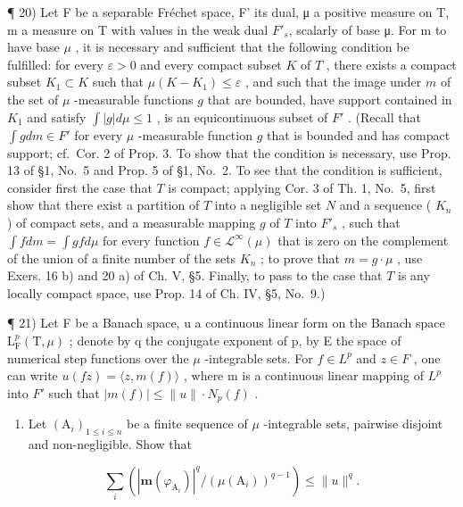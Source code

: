 ¶ 20) Let F be a separable Fréchet space, F' its dual, μ a positive measure on T, m a measure on T with values in the weak dual \(F'_s\), scalarly of base μ. For m to have base \(\mu\) , it is necessary and sufficient that the following condition be fulfilled: for every \(\varepsilon > 0\) and every compact subset \(K\) of \(T\) , there exists a compact subset \(K_1 \subset K\) such that \(\mu(K - K_1) \leqslant \varepsilon\) , and such that the image under \(m\) of the set of \(\mu\) -measurable functions \(g\) that are bounded, have support contained in \(K_1\) and satisfy \(\int |g| d\mu \leqslant 1\) , is an equicontinuous subset of \(F'\) . (Recall that \(\int g dm \in F'\) for every \(\mu\) -measurable function \(g\) that is bounded and has compact support; cf.~Cor. 2 of Prop. 3. To show that the condition is necessary, use Prop. 13 of §1, No.~5 and Prop. 5 of §1, No.~2. To see that the condition is sufficient, consider first the case that \(T\) is compact; applying Cor. 3 of Th. 1, No.~5, first show that there exist a partition of \(T\) into a negligible set \(N\) and a sequence ( \(K_n\) ) of compact sets, and a measurable mapping \(g\) of \(T\) into \(F'_s\) , such that \(\int f dm = \int g f d\mu\) for every function \(f \in \mathcal{L}^\infty(\mu)\) that is zero on the complement of the union of a finite number of the sets \(K_n\) ; to prove that \(m = g \cdot \mu\) , use Exers. 16 b) and 20 a) of Ch. V, §5. Finally, to pass to the case that \(T\) is any locally compact space, use Prop. 14 of Ch. IV, §5, No.~9.)

¶ 21) Let F be a Banach space, u a continuous linear form on the Banach space \(\mathrm{L}_{\mathrm{F}}^{p}(\mathrm{T},\mu)\) ; denote by q the conjugate exponent of p, by E the space of numerical step functions over the \(\mu\) -integrable sets. For \(f \in L^{p}\) and \(z \in F\) , one can write \(u(fz) = \langle z, m(f) \rangle\) , where m is a continuous linear mapping of \(L^{p}\) into \(F'\) such that \(|m(f)| \leqslant \|u\| \cdot N_{p}(f)\) .

\begin{enumerate}
\def\labelenumi{\alph{enumi})}
\tightlist
\item
  Let \((\mathrm{A}_i)_{1\leqslant i\leqslant n}\) be a finite sequence of \(\mu\) -integrable sets, pairwise disjoint and non-negligible. Show that
\end{enumerate}

\[
\sum_ {i} \left(| \mathbf {m} (\varphi_ {\mathrm{A} _ {i}}) | ^ {q} / (\mu (\mathrm{A} _ {i})) ^ {q - 1}\right) \leqslant \| u \| ^ {q}.
\]

